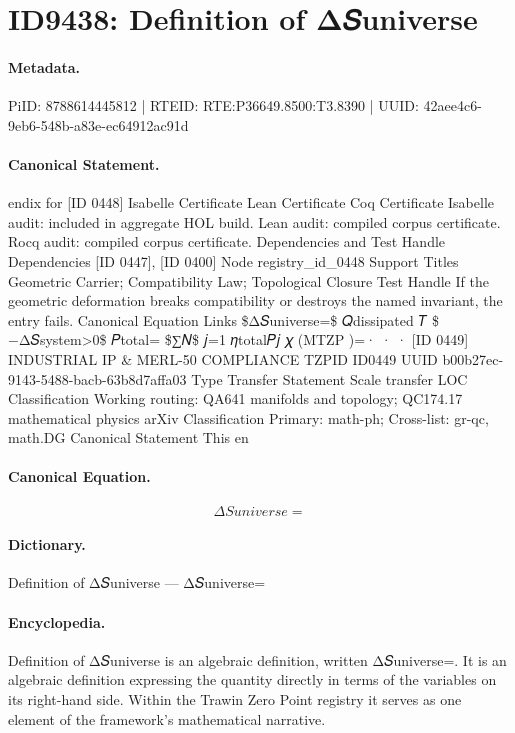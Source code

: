 \section*{ID9438: Definition of Δ𝑆universe}
\paragraph{Metadata.}
PiID: 8788614445812 | RTEID: RTE:P36649.8500:T3.8390 | UUID: 42aee4c6-9eb6-548b-a83e-ec64912ac91d

\paragraph{Canonical Statement.}
endix for [ID 0448] Isabelle Certificate Lean Certificate Coq Certificate Isabelle audit: included in aggregate HOL build. Lean audit: compiled corpus certificate. Rocq audit: compiled corpus certificate. Dependencies and Test Handle Dependencies [ID 0447], [ID 0400] Node registry\_id\_0448 Support Titles Geometric Carrier; Compatibility Law; Topological Closure Test Handle If the geometric deformation breaks compatibility or destroys the named invariant, the entry fails. Canonical Equation Links \$Δ𝑆universe=\$ 𝑄dissipated 𝑇 \$−Δ𝑆system>0\$ 𝑃total= \$∑𝑁\$ 𝑗=1 𝜂total𝑃𝑗 𝜒 (MTZP )=· · · [ID 0449] INDUSTRIAL IP \& MERL-50 COMPLIANCE TZPID ID0449 UUID b00b27ec-9143-5488-bacb-63b8d7affa03 Type Transfer Statement Scale transfer LOC Classification Working routing: QA641 manifolds and topology; QC174.17 mathematical physics arXiv Classification Primary: math-ph; Cross-list: gr-qc, math.DG Canonical Statement This en

\paragraph{Canonical Equation.}
\[
Δ𝑆universe=
\]

\paragraph{Dictionary.}
Definition of Δ𝑆universe — Δ𝑆universe=

\paragraph{Encyclopedia.}
Definition of Δ𝑆universe is an algebraic definition, written Δ𝑆universe=. It is an algebraic definition expressing the quantity directly in terms of the variables on its right-hand side. Within the Trawin Zero Point registry it serves as one element of the framework's mathematical narrative.
